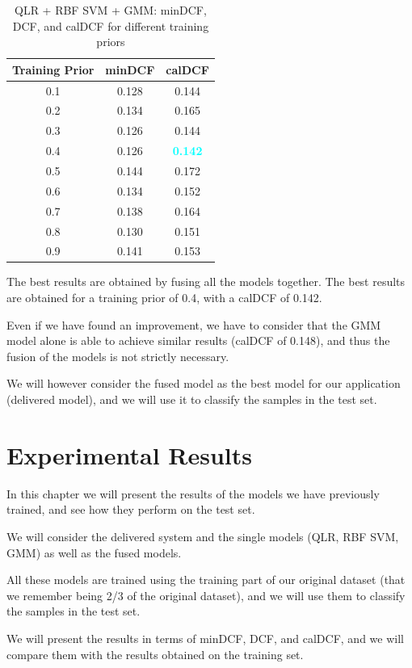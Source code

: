 \documentclass[12pt]{report}
\newcommand{\nnl}{%
    \newline
    \newline
}
\newcommand{\nl}{%
    \newline
    \noindent
}
\begin{document}
\begin{table}[H]
    \centering
    \begin{tabular}{|c|c|c|}
        \hline
        \rowcolor{blue!10}
        \textbf{Training Prior} & \textbf{minDCF} & \textbf{calDCF}                  \\
        \hline
        0.1                     & 0.128           & 0.144                            \\
        \hline
        0.2                     & 0.134           & 0.165                            \\
        \hline
        0.3                     & 0.126           & 0.144                            \\
        \hline
        0.4                     & 0.126           & \textcolor{cyan}{\textbf{0.142}} \\
        \hline
        0.5                     & 0.144           & 0.172                            \\
        \hline
        0.6                     & 0.134           & 0.152                            \\
        \hline
        0.7                     & 0.138           & 0.164                            \\
        \hline
        0.8                     & 0.130           & 0.151                            \\
        \hline
        0.9                     & 0.141           & 0.153                            \\
        \hline
    \end{tabular}
    \caption{QLR + RBF SVM + GMM: minDCF, DCF, and calDCF for different training priors}
    \label{tab:QLR_RBF_SVM_GMM_Priors}
\end{table}
\noindent
The best results are obtained by fusing all the models together. The best results are obtained for a training prior of 0.4, with a calDCF of 0.142.
\nl
Even if we have found an improvement, we have to consider that the GMM model alone is able to achieve similar results (calDCF of 0.148), and thus the fusion of the models is not strictly necessary.
\nnl
We will however consider the fused model as the best model for our application (delivered model), and we will use it to classify the samples in the test set.

\chapter{Experimental Results}
In this chapter we will present the results of the models we have previously trained, and see how they perform on the test set.
\nnl
We will consider the delivered system and the single models (QLR, RBF SVM, GMM) as well as the fused models.
\nl
All these models are trained using the training part of our original dataset (that we remember being 2/3 of the original dataset), and we will use them to classify the samples in the test set.
\nnl
We will present the results in terms of minDCF, DCF, and calDCF, and we will compare them with the results obtained on the training set.
\end{document}
